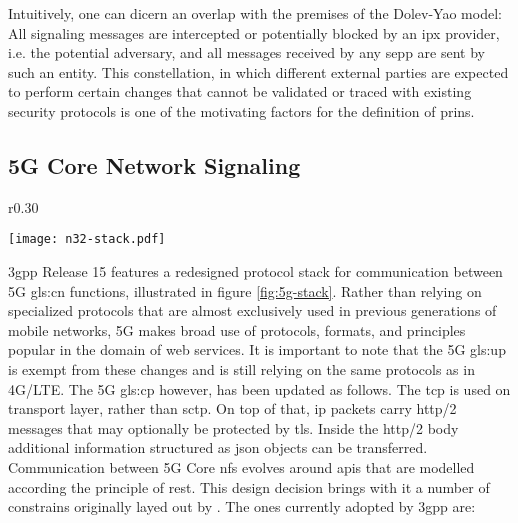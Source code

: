 Intuitively, one can dicern an overlap with the premises of the Dolev-Yao model:
All signaling messages are intercepted or potentially blocked by an \gls{ipx} provider, i.e. the potential adversary, and all messages received by any \gls{sepp} are sent by such an entity.
This constellation, in which different external parties are expected to perform certain changes that cannot be validated or traced with existing security protocols is one of the motivating factors for the definition of \gls{prins}.

\subsection{5G Core Network Signaling}

\begin{wrapfigure}{r}{0.30\textwidth}
    \begin{center}
    \texttt{[image: n32-stack.pdf]}
    \end{center}
    \caption{5G control plane stack, according to TS 29.573 (\cite{3gpp.29.573}, p. 11)}
    \label{fig:5g-stack}
\end{wrapfigure}

\gls{3gpp} Release 15 features a redesigned protocol stack for communication between 5G \gls{gls:cn} functions, illustrated in figure \ref{fig:5g-stack}.
Rather than relying on specialized protocols that are almost exclusively used in previous generations of mobile networks, 5G makes broad use of protocols, formats, and principles popular in the domain of web services.
It is important to note that the 5G \gls{gls:up} is exempt from these changes and is still relying on the same protocols as in 4G/LTE.
The 5G \gls{gls:cp} however, has been updated as follows.
The \gls{tcp} is used on transport layer, rather than \gls{sctp}.
On top of that, \gls{ip} packets carry \gls{http}/2 messages that may optionally be protected by \gls{tls}.
Inside the \gls{http}/2 body additional information structured as \gls{json} objects can be transferred.
Communication between 5G Core \glspl{nf} evolves around \glspl{api} that are modelled according the principle of \gls{rest}.
This design decision brings with it a number of constrains originally layed out by \cite{fielding2000arch}.
The ones currently adopted by \gls{3gpp} are:

